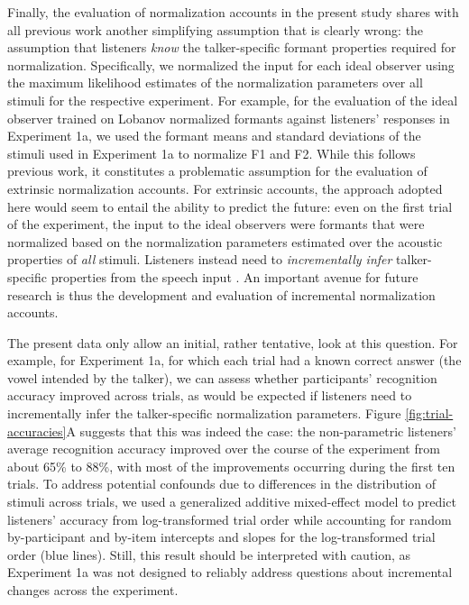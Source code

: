 \documentclass[preprint]{JASA}
\begin{document}
Finally, the evaluation of normalization accounts in the present study shares with all previous work \citep[e.g.,][]{apfelbaum-mcmurray2015, cole2010, mcmurray-jongman2011, barreda2021, nearey1989, richter2017} another simplifying assumption that is clearly wrong: the assumption that listeners \emph{know} the talker-specific formant properties required for normalization. Specifically, we normalized the input for each ideal observer using the maximum likelihood estimates of the normalization parameters over all stimuli for the respective experiment. For example, for the evaluation of the ideal observer trained on Lobanov normalized formants against listeners' responses in Experiment 1a, we used the formant means and standard deviations of the stimuli used in Experiment 1a to normalize F1 and F2. While this follows previous work, it constitutes a problematic assumption for the evaluation of extrinsic normalization accounts. For extrinsic accounts, the approach adopted here would seem to entail the ability to predict the future: even on the first trial of the experiment, the input to the ideal observers were formants that were normalized based on the normalization parameters estimated over the acoustic properties of \emph{all} stimuli. Listeners instead need to \emph{incrementally infer} talker-specific properties from the speech input \citep{barreda-jaeger2025, nearey-assmann2007, xie2023}. An important avenue for future research is thus the development and evaluation of incremental normalization accounts.

The present data only allow an initial, rather tentative, look at this question. For example, for Experiment 1a, for which each trial had a known correct answer (the vowel intended by the talker), we can assess whether participants' recognition accuracy improved across trials, as would be expected if listeners need to incrementally infer the talker-specific normalization parameters. Figure \ref{fig:trial-accuracies}A suggests that this was indeed the case: the non-parametric listeners' average recognition accuracy improved over the course of the experiment from about 65\% to 88\%, with most of the improvements occurring during the first ten trials. To address potential confounds due to differences in the distribution of stimuli across trials, we used a generalized additive mixed-effect model to predict listeners' accuracy from log-transformed trial order while accounting for random by-participant and by-item intercepts and slopes for the log-transformed trial order (blue lines). Still, this result should be interpreted with caution, as Experiment 1a was not designed to reliably address questions about incremental changes across the experiment.
\end{document}
